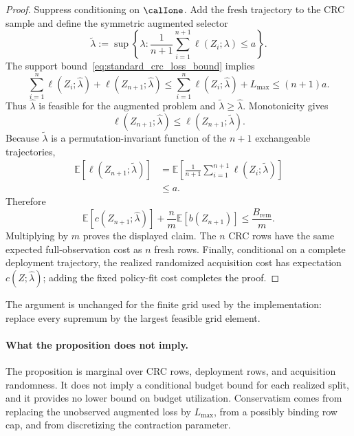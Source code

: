 \begin{proof}
Suppress conditioning on $\calIone$.  Add the fresh trajectory to the CRC
sample and define the symmetric augmented selector
\[
    \widetilde\lambda
    :=\sup\left\{\lambda:
      \frac{1}{n+1}\sum_{i=1}^{n+1}\ell(Z_i;\lambda)
      \leq a
    \right\}.
\]
The support bound~\eqref{eq:standard_crc_loss_bound} implies
\[
    \sum_{i=1}^{n}\ell(Z_i;\widehat\lambda)
    +\ell(Z_{n+1};\widehat\lambda)
    \leq
    \sum_{i=1}^{n}\ell(Z_i;\widehat\lambda)+L_{\max}
    \leq(n+1)a.
\]
Thus $\widehat\lambda$ is feasible for the augmented problem and
$\widetilde\lambda\geq\widehat\lambda$.  Monotonicity gives
\[
    \ell(Z_{n+1};\widehat\lambda)
    \leq\ell(Z_{n+1};\widetilde\lambda).
\]
Because $\widetilde\lambda$ is a permutation-invariant function of the
$n+1$ exchangeable trajectories,
\begin{align*}
    \mathbb E[\ell(Z_{n+1};\widetilde\lambda)]
    &=\mathbb E\!\left[
       \frac{1}{n+1}\sum_{i=1}^{n+1}
       \ell(Z_i;\widetilde\lambda)
      \right]\\
    &\leq a.
\end{align*}
Therefore
\[
    \mathbb E[c(Z_{n+1};\widehat\lambda)]
    +\frac{n}{m}\mathbb E[b(Z_{n+1})]
    \leq\frac{B_{\mathrm{rem}}}{m}.
\]
Multiplying by $m$ proves the displayed claim.  The $n$ CRC rows have the
same expected full-observation cost as $n$ fresh rows.  Finally, conditional
on a complete deployment trajectory, the realized randomized acquisition
cost has expectation $c(Z;\widehat\lambda)$; adding the fixed policy-fit cost
completes the proof.
\end{proof}

The argument is unchanged for the finite grid used by the implementation:
replace every supremum by the largest feasible grid element.

\paragraph{What the proposition does not imply.}
The proposition is marginal over CRC rows, deployment rows, and acquisition
randomness.  It does not imply a conditional budget bound for each realized
split, and it provides no lower bound on budget utilization.  Conservatism
comes from replacing the unobserved augmented loss by $L_{\max}$, from a
possibly binding row cap, and from discretizing the contraction parameter.
